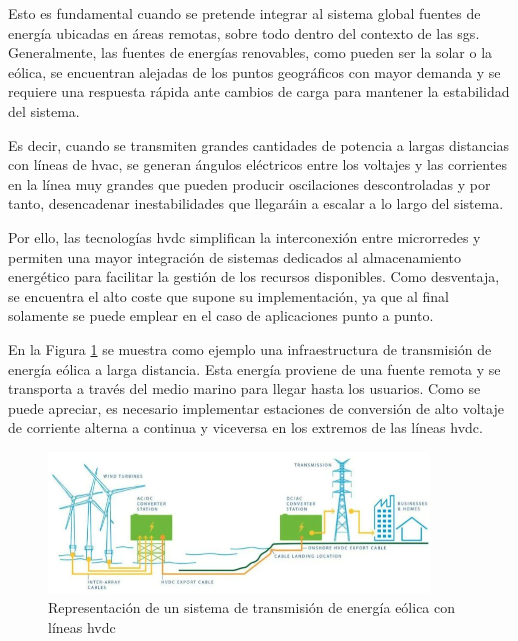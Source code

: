 \vspace{3mm}

Esto es fundamental cuando se pretende integrar al sistema global fuentes de energía ubicadas en áreas remotas, sobre todo dentro del contexto de las \gls{sg}s. Generalmente, las fuentes de energías renovables, como pueden ser la solar o la eólica, se encuentran alejadas de los puntos geográficos con mayor demanda y se requiere una respuesta rápida ante cambios de carga para mantener la estabilidad del sistema. 

\vspace{3mm}

Es decir, cuando se transmiten grandes cantidades de potencia a largas distancias con líneas de \gls{hvac}, se generan ángulos eléctricos entre los voltajes y las corrientes en la línea muy grandes que pueden producir oscilaciones descontroladas y por tanto, desencadenar inestabilidades que llegaráin a escalar a lo largo del sistema. 

\vspace{3mm}

Por ello, las tecnologías \gls{hvdc} simplifican la interconexión entre microrredes y permiten una mayor integración de sistemas dedicados al almacenamiento energético para facilitar la gestión de los recursos disponibles. Como desventaja, se encuentra el alto coste que supone su implementación, ya que al final solamente se puede emplear en el caso de aplicaciones punto a punto.

\vspace{3mm}

En la Figura \ref{fig:hvdc} se muestra como ejemplo una infraestructura de transmisión de energía eólica a larga distancia. Esta energía proviene de una fuente remota y se transporta a través del medio marino para llegar hasta los usuarios. Como se puede apreciar, es necesario implementar estaciones de conversión de alto voltaje de corriente alterna a continua y viceversa en los extremos de las líneas \gls{hvdc}.

\begin{figure}[h!]
  \centering
  \includegraphics[width=0.9\textwidth]{img/teoria/hvdc.png}
  \caption{Representación de un sistema de transmisión de energía eólica con líneas \gls{hvdc} \cite{hvdc2}}
  \label{fig:hvdc}
\end{figure}

